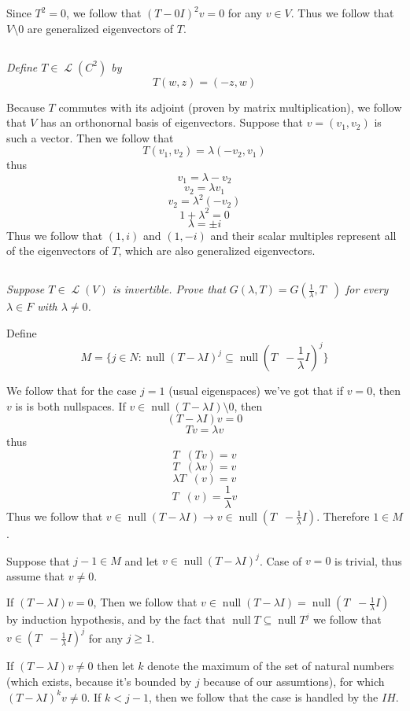 \documentclass[11pt,oneside,titlepage]{book}
\DeclareMathOperator \map {\mathcal {L}}
\DeclareMathOperator \ns {null}
\DeclareMathOperator \inv {^{-1}}
\begin{document}
Since $T^2 = 0$, we follow that $(T - 0I)^2 v = 0$ for any $v \in V$. Thus we follow that
$V \setminus 0$ are generalized eigenvectors of $T$.

\subsection{}

\textit{Define $T \in \map(C^2)$ by
  $$T(w, z) = (-z, w)$$}

Because $T$ commutes with its adjoint (proven by matrix multiplication), we follow that $V$
has an orthonornal basis of eigenvectors. Suppose that $v = (v_1, v_2)$ is
such a vector. Then we follow that
$$T (v_1, v_2) = \lambda (-v_2, v_1)$$
thus
$$v_1 = \lambda -v_2$$
$$v_2 = \lambda v_1$$
$$v_2 = \lambda^2 (- v_2)$$
$$1 + \lambda^2 = 0$$
$$\lambda = \pm i$$
Thus we follow that $(1, i)$ and $(1, -i)$ and their scalar multiples represent all of the
eigenvectors of $T$, which are also generalized eigenvectors.

\subsection{}

\textit{Suppose $T \in \map(V)$ is invertible. Prove that $G(\lambda, T) =
  G(\frac{1}{\lambda}, T\inv)$ for every $\lambda \in F$ with $\lambda \neq 0$.}

Define
$$M = \{j \in N: \ns (T - \lambda I)^j \subseteq \ns (T\inv - \frac{1}{\lambda} I)^j \}$$

We follow that for the case $j = 1$ (usual eigenspaces) we've got that
if $v = 0$, then $v$ is is both nullspaces.
If $v \in \ns (T - \lambda I) \setminus 0$, then
$$(T - \lambda I) v = 0$$
$$Tv = \lambda v$$
thus
$$T\inv (Tv) = v$$
$$T\inv (\lambda v) = v$$
$$\lambda T\inv ( v) = v$$
$$T\inv ( v) = \frac {1} {\lambda} v$$
Thus we follow that $v \in \ns (T - \lambda I) \to v \in \ns (T \inv - \frac {1}{ \lambda} I)$.
Therefore $1 \in M$.

Suppose that $j - 1 \in M$ and let $v \in \ns (T - \lambda I)^j$. Case of $v = 0$ is trivial,
thus assume that $v \neq 0$.

If $(T - \lambda I) v = 0$, Then we follow that
$v \in \ns (T - \lambda I) = \ns (T\inv - \frac{1}{\lambda} I)$  by induction hypothesis,
and by the fact that $\ns T \subseteq \ns T^j$ we follow that
$v \in (T\inv - \frac{1}{\lambda} I)^j$ for any $j \geq 1$.

If $(T - \lambda I) v \neq 0$ then let $k$ denote the maximum of the set of natural numbers
(which exists, because it's bounded by $j$ because of our assumtions),
for which $(T - \lambda I)^k v \neq 0$. If $k < j - 1$, then we follow that the case is handled
by the $IH$.
\end{document}

